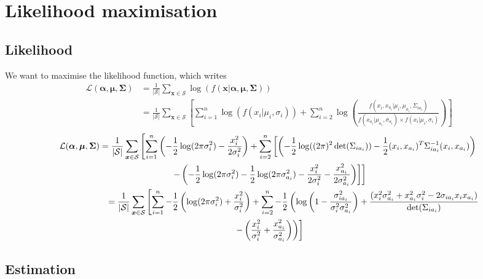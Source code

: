 \documentclass[a4paper,10pt]{article}
\begin{document}
\section{Likelihood maximisation}

\subsection{Likelihood}
We want to maximise the likelihood function, which writes \\
\begin{align*} 
\mathcal{L}(\bm{\alpha},\bm{\mu},\bm{\Sigma}) &= \frac{1}{|\mathcal{S}|}\sum_{\bm{x} \in \mathcal{S}} \log (f(\bm{x}|\bm{\alpha},\bm{\mu},\bm{\Sigma})) \\
&=\frac{1}{|\mathcal{S}|}\sum_{\bm{x} \in \mathcal{S}} \left[ \sum\limits_{i=1}^n\log(f(x_i|\mu_i,\sigma_i)) + \sum\limits_{i=2}^n \log\left( 
\frac{f(x_i,x_{a_i}|\mu_i, \mu_{a_i},\Sigma_{ia_i})}{f(x_{a_i}|\mu_{a_i},\sigma_{a_i})\times f(x_i|\mu_i,\sigma_i)} \right) \right]
\end{align*}
\begin{multline*}
\mathcal{L}(\bm{\alpha},\bm{\mu},\bm{\Sigma}) =\frac{1}{|\mathcal{S}|}\sum_{\bm{x} \in \mathcal{S}} \left[ \sum\limits_{i=1}^n \left( -\frac{1}{2}\log(2\pi\sigma_i^ 2)-\frac{x_i^ 2}{2\sigma_i^ 2}\right)
+\sum\limits_{i=2}^n\left[\left( -\frac{1}{2}\log((2\pi)^ 2\det(\Sigma_{ia_i})) - \frac{1}{2}(x_i,x_{a_i})^{T}\Sigma_{ia_i}^{-1}(x_i,x_{a_i})\right)\right.\right.\\
\left.\left.-\left(-\frac{1}{2}\log(2\pi\sigma_i^ 2)-\frac{1}{2}\log(2\pi\sigma_{a_i}^ 2) -\frac{x_i^ 2}{2\sigma_i^ 2}-\frac{x_{a_i}^ 2}{2\sigma_{a_i}^ 2}\right)\right]\right]\\
\text{\hspace{2cm}}=\frac{1}{|\mathcal{S}|}\sum_{\bm{x} \in \mathcal{S}} \left[ \sum\limits_{i=1}^n -\frac{1}{2}\left( \log(2\pi\sigma_i^ 2)+\frac{x_i^ 2}{\sigma_i^ 2}\right)
+\sum\limits_{i=2}^n-\frac{1}{2}\left(\log\left(1-\frac{\sigma_{ia_i}^2}{\sigma_i^2 \sigma_{a_i}^2}\right)+\frac{(x_i^2\sigma_{a_i}^2+x_{a_i}^2\sigma_i^2-2\sigma_{ia_i}x_ix_{a_i})}
{\det(\Sigma_{ia_i})}\right.\right.\\
\left.\left.-\left(\frac{x_i^2}{\sigma_i^2}+\frac{x_{a_i}^2}{\sigma_{a_i}^2}\right)\right)\right]
\end{multline*}

\subsection{Estimation}
\end{document}
